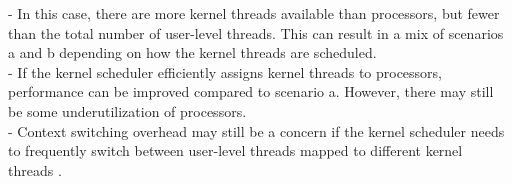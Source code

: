 \documentclass[a4paper,12pt,fleqn]{article}
\begin{document}
\begin{enumerate}
\begin{answer}
{- In this case, there are more kernel threads available than processors, but fewer than the total number of user-level threads. This can result in a mix of scenarios a and b depending on how the kernel threads are scheduled.\\
- If the kernel scheduler efficiently assigns kernel threads to processors, performance can be improved compared to scenario a. However, there may still be some underutilization of processors.\\
- Context switching overhead may still be a concern if the kernel scheduler needs to frequently switch between user-level threads mapped to different kernel threads
}.
\end{answer}

\end{enumerate}

\end{document}
